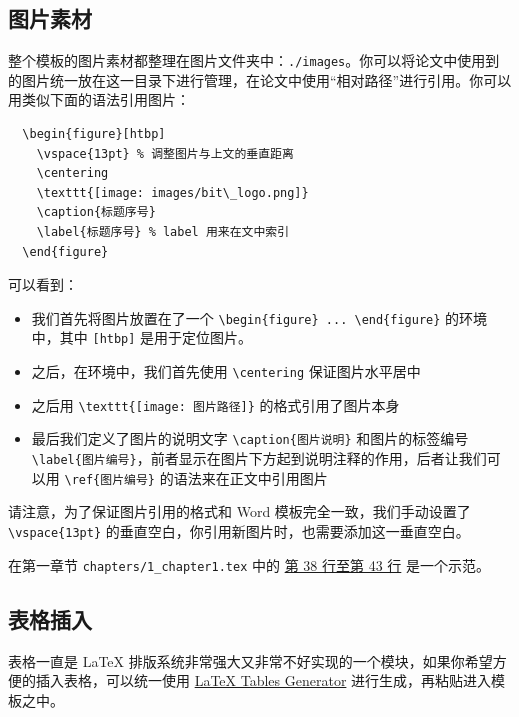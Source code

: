 \subsection{图片素材}

整个模板的图片素材都整理在图片文件夹中：\texttt{./images}。你可以将论文中使用到的图片统一放在这一目录下进行管理，在论文中使用“相对路径”进行引用。你可以用类似下面的语法引用图片：

\begin{verbatim}
  \begin{figure}[htbp]
    \vspace{13pt} % 调整图片与上文的垂直距离
    \centering
    \texttt{[image: images/bit\_logo.png]}
    \caption{标题序号}
    \label{标题序号} % label 用来在文中索引
  \end{figure}
\end{verbatim}

可以看到：

\begin{itemize}
  \item 我们首先将图片放置在了一个 \verb|\begin{figure} ... \end{figure}| 的环境中，其中 \texttt{[htbp]} 是用于定位图片。
  \item 之后，在环境中，我们首先使用 \verb|\centering| 保证图片水平居中
  \item 之后用 \verb|\texttt{[image: 图片路径]}| 的格式引用了图片本身
  \item 最后我们定义了图片的说明文字 \verb|\caption{图片说明}| 和图片的标签编号 \verb|\label{图片编号}|，前者显示在图片下方起到说明注释的作用，后者让我们可以用 \verb|\ref{图片编号}| 的语法来在正文中引用图片
\end{itemize}

请注意，为了保证图片引用的格式和 Word 模板完全一致，我们手动设置了 \verb|\vspace{13pt}| 的垂直空白，你引用新图片时，也需要添加这一垂直空白。

在第一章节 \texttt{chapters/1\_chapter1.tex} 中的 \href{https://github.com/spencerwooo/BIThesis/blob/master/graduation-thesis/chapters/1_chapter1.tex#L38-L43}{第 38 行至第 43 行} 是一个示范。

\subsection{表格插入}

表格一直是 {\LaTeX} 排版系统非常强大又非常不好实现的一个模块，如果你希望方便的插入表格，可以统一使用 \href{https://www.tablesgenerator.com/}{LaTeX Tables Generator} 进行生成，再粘贴进入模板之中。

